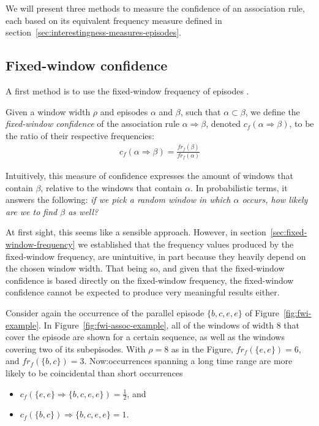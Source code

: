 We will present three methods to measure the confidence of an association rule, each based on its equivalent frequency measure defined in section~\ref{sec:interestingness-measures-episodes}.

\subsection{Fixed-window confidence}

A first method is to use the fixed-window frequency of episodes \citep{mannila1997discovery}.

\begin{definition}
Given a window width $ \rho $ and episodes $ \alpha $ and $ \beta $, such that $ \alpha \subset \beta $, we define the \emph{fixed-window confidence} of the association rule $ \alpha \Rightarrow \beta $, denoted $ c_f(\alpha \Rightarrow \beta) $, to be the ratio of their respective frequencies:
\begin{align*}
c_f(\alpha \Rightarrow \beta) = \frac{ fr_f(\beta) }{ fr_f(\alpha) }
\end{align*}
\end{definition}

Intuitively, this measure of confidence expresses the amount of windows that contain $ \beta $, relative to the windows that contain $ \alpha $. In probabilistic terms, it answers the following: \emph{if we pick a random window in which $ \alpha $ occurs, how likely are we to find $ \beta $ as well?}

At first sight, this seems like a sensible approach. However, in section~\ref{sec:fixed-window-frequency} we established that the frequency values produced by the fixed-window frequency, are unintuitive, in part because they heavily depend on the chosen window width. That being so, and given that the fixed-window confidence is based directly on the fixed-window frequency, the fixed-window confidence cannot be expected to produce very meaningful results either.



\iffalse
Consider again the occurrence of the parallel episode $ \{ b, c, e, e \} $ of Figure~\ref{fig:fwi-example}. In Figure~\ref{fig:fwi-assoc-example}, all of the windows of width $ 8 $ that cover the episode are shown for a certain sequence, as well as the windows covering two of its subepisodes. With $ \rho = 8 $ as in the Figure, $ fr_f(\{ e, e \}) = 6 $, and $ fr_f(\{ b, c \}) = 3 $. Now:occurrences spanning a long time range are more likely to be coincidental than short occurrences
\begin{itemize}
\item $ c_f(\{ e, e \} \Rightarrow \{ b, c, e, e \}) = \frac12 $, and
\item $ c_f(\{ b, c \}) \Rightarrow \{ b, c, e, e \} = 1 $.
\end{itemize}

